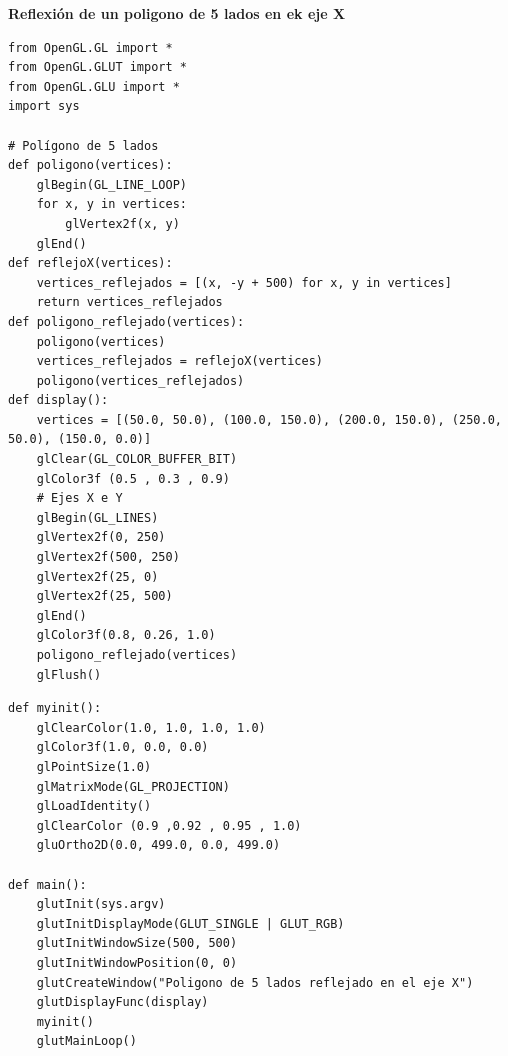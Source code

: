\documentclass[a4paper]{article}
\begin{document}
\newpage
\Large{\textbf{Reflexión de un poligono de 5 lados en ek eje X}\\[-0.4cm]
\begin{center}
\begin{mycodebox}
\begin{lstlisting}
from OpenGL.GL import *
from OpenGL.GLUT import *
from OpenGL.GLU import *
import sys

# Polígono de 5 lados
def poligono(vertices):
    glBegin(GL_LINE_LOOP)
    for x, y in vertices:
        glVertex2f(x, y)
    glEnd()
def reflejoX(vertices):
    vertices_reflejados = [(x, -y + 500) for x, y in vertices]
    return vertices_reflejados
def poligono_reflejado(vertices):
    poligono(vertices)
    vertices_reflejados = reflejoX(vertices)
    poligono(vertices_reflejados)
def display():
    vertices = [(50.0, 50.0), (100.0, 150.0), (200.0, 150.0), (250.0, 50.0), (150.0, 0.0)]
    glClear(GL_COLOR_BUFFER_BIT)
    glColor3f (0.5 , 0.3 , 0.9)
    # Ejes X e Y
    glBegin(GL_LINES)
    glVertex2f(0, 250)
    glVertex2f(500, 250)
    glVertex2f(25, 0)
    glVertex2f(25, 500)
    glEnd()
    glColor3f(0.8, 0.26, 1.0)
    poligono_reflejado(vertices)
    glFlush()
\end{lstlisting}
\end{mycodebox}
\end{center}

\begin{center}
\begin{mycodebox}
\begin{lstlisting}
def myinit():
    glClearColor(1.0, 1.0, 1.0, 1.0)
    glColor3f(1.0, 0.0, 0.0)
    glPointSize(1.0)
    glMatrixMode(GL_PROJECTION)
    glLoadIdentity()
    glClearColor (0.9 ,0.92 , 0.95 , 1.0)
    gluOrtho2D(0.0, 499.0, 0.0, 499.0)

def main():
    glutInit(sys.argv)
    glutInitDisplayMode(GLUT_SINGLE | GLUT_RGB)
    glutInitWindowSize(500, 500)
    glutInitWindowPosition(0, 0)
    glutCreateWindow("Poligono de 5 lados reflejado en el eje X")
    glutDisplayFunc(display)
    myinit()
    glutMainLoop()


\end{lstlisting}
\end{mycodebox}
\end{center}}
\end{document}
